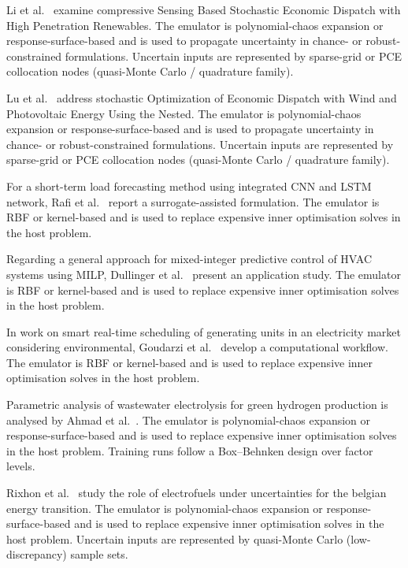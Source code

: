 Li et al.~\cite{Li20191438} examine compressive Sensing Based Stochastic Economic Dispatch with High Penetration Renewables. The emulator is polynomial-chaos expansion or response-surface-based and is used to propagate uncertainty in chance- or robust-constrained formulations. Uncertain inputs are represented by sparse-grid or PCE collocation nodes (quasi-Monte Carlo / quadrature family).

Lu et al.~\cite{Lu201991827} address stochastic Optimization of Economic Dispatch with Wind and Photovoltaic Energy Using the Nested. The emulator is polynomial-chaos expansion or response-surface-based and is used to propagate uncertainty in chance- or robust-constrained formulations. Uncertain inputs are represented by sparse-grid or PCE collocation nodes (quasi-Monte Carlo / quadrature family).

For a short-term load forecasting method using integrated CNN and LSTM network, Rafi et al.~\cite{Rafi202132436} report a surrogate-assisted formulation. The emulator is RBF or kernel-based and is used to replace expensive inner optimisation solves in the host problem.

Regarding a general approach for mixed-integer predictive control of HVAC systems using MILP, Dullinger et al.~\cite{Dullinger20181646} present an application study. The emulator is RBF or kernel-based and is used to replace expensive inner optimisation solves in the host problem.

In work on smart real-time scheduling of generating units in an electricity market considering environmental, Goudarzi et al.~\cite{Goudarzi2017667} develop a computational workflow. The emulator is RBF or kernel-based and is used to replace expensive inner optimisation solves in the host problem.

Parametric analysis of wastewater electrolysis for green hydrogen production is analysed by Ahmad et al.~\cite{Ahmad202451}. The emulator is polynomial-chaos expansion or response-surface-based and is used to replace expensive inner optimisation solves in the host problem. Training runs follow a Box--Behnken design over factor levels.

Rixhon et al.~\cite{Rixhon2021} study the role of electrofuels under uncertainties for the belgian energy transition. The emulator is polynomial-chaos expansion or response-surface-based and is used to replace expensive inner optimisation solves in the host problem. Uncertain inputs are represented by quasi-Monte Carlo (low-discrepancy) sample sets.

